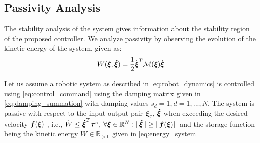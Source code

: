 \subsection{Passivity Analysis}
The stability analysis of the system gives information about the stability region of the proposed controller. We analyze passivity by observing the evolution of the kinetic energy of the system, given as:
\begin{equation}
	W(\boldsymbol{\xi}, \boldsymbol{\dot \xi}) = \frac{1}{2}  \dot{\boldsymbol{\xi}}^T \mathcal{M}(\boldsymbol{\xi}) \dot{\boldsymbol{\xi}} \label{eq:energy_system}
\end{equation}

\begin{lemma} \label{lemma:passivity}
	Let us assume a robotic system as described in \eqref{eq:robot_dynamics} is controlled using \eqref{eq:control_command} using the damping matrix  given in \eqref{eq:damping_summation} with damping values $s_d = 1, d = 1, ..., N$.
   The system is passive with respect to the input-output pair $\boldsymbol{\xi}_e$, $\boldsymbol{\dot \xi}$ when exceeding the desired velocity $\boldsymbol{f}(\boldsymbol{\xi})$ , i.e., $\dot{W} \leq \boldsymbol{\dot \xi}^T \boldsymbol{\tau}^e, \; \forall \boldsymbol{\xi} \in \mathbb{R}^N: \| \boldsymbol{\dot \xi} \| \geq \| \boldsymbol{f}(\boldsymbol{\xi}) \|$ and the storage function being the kinetic energy $W \in \mathbb{R}_{>0}$ given in \eqref{eq:energy_system}
\end{lemma}

\iflong

